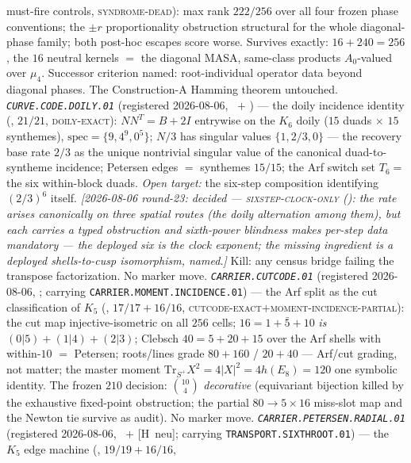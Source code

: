 must-fire controls, \textsc{syndrome-dead}): max rank $222/256$
over all four frozen phase conventions; the $\pm r$
proportionality obstruction structural for the whole
diagonal-phase family; both post-hoc escapes score worse.
Survives exactly: $16+240=256$, the $16$ neutral kernels $=$ the
diagonal MASA, same-class products $A_0$-valued over $\mu_4$.
Successor criterion named: root-individual operator data beyond
diagonal phases.  The Construction-A Hamming theorem untouched.
\emph{\texttt{CURVE.CODE.DOILY.01}} (registered 2026-08-06, \mE\
$+$ \mO) --- the doily incidence identity
(, $21/21$,
\textsc{doily-exact}): $NN^{T}=B+2I$ entrywise on the $K_6$ doily
($15$ duads $\times$ $15$ synthemes), $\mathrm{spec}=\{9,4^9,0^5\}$;
$N/3$ has singular values $\{1,2/3,0\}$ --- the recovery base rate
$2/3$ as the unique nontrivial singular value of the canonical
duad-to-syntheme incidence; Petersen edges $=$ synthemes $15/15$;
the Arf switch set $T_6=$ the six within-block duads.  \emph{Open
target:} the six-step composition identifying $(2/3)^6$ itself.
\emph{[2026-08-06 round-23: decided ---
\textsc{sixstep-clock-only}
(): the rate arises
canonically on three spatial routes (the doily alternation among
them), but each carries a typed obstruction and sixth-power
blindness makes per-step data mandatory --- the deployed six is
the clock exponent; the missing ingredient is a deployed
shells-to-cusp isomorphism, named.]}
Kill: any census bridge failing the transpose factorization.  No
marker move.
\emph{\texttt{CARRIER.CUTCODE.01}} (registered 2026-08-06, \mE;
carrying \texttt{CARRIER.MOMENT.INCIDENCE.01}) --- the Arf split
as the cut classification of $K_5$
(, $17/17+16/16$,
\textsc{cutcode-exact}$+$\textsc{moment-incidence-partial}): the
cut map injective-isometric on all $256$ cells;
$16=1+\bar5+10$ \emph{is} $(0|5)+(1|4)+(2|3)$; Clebsch
$40=5+20+15$ over the Arf shells with within-$10$ $=$ Petersen;
roots/lines grade $80+160$ / $20+40$ --- Arf/cut grading, not
matter; the master moment
$\mathrm{Tr}_{S^{+}}X^2=4|X|^2=4h(E_8)=120$ one symbolic
identity.  The frozen $210$ decision: $\binom{10}{4}$
\emph{decorative} (equivariant bijection killed by the exhaustive
fixed-point obstruction; the partial $80\to5\times16$ miss-slot
map and the Newton tie survive as audit).  No marker move.
\emph{\texttt{CARRIER.PETERSEN.RADIAL.01}} (registered 2026-08-06,
\mE\ $+$ [H~neu]; carrying \texttt{TRANSPORT.SIXTHROOT.01}) ---
the $K_5$ edge machine
(, $19/19+16/16$,
